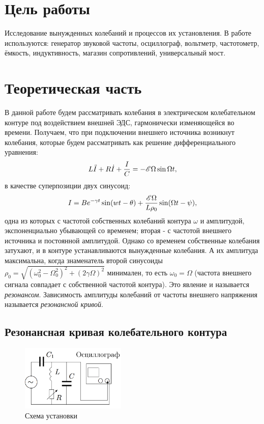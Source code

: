 \documentclass{letnab}
\begin{document}


\section{Цель работы}
Исследование вынужденных колебаний и процессов их установления.
В работе используются: генератор звуковой частоты, осциллограф, вольтметр, частотометр, ёмкость, индуктивность, магазин сопротивлений, универсальный мост.
\section{Теоретическая часть}

В данной работе будем рассматривать колебания в электрическом колебательном контуре под воздействием внешней ЭДС, гармонически изменяющейся во времени. 
Получаем, что при подключении внешнего источника возникнут колебания, которые будем рассматривать как решение дифференциального уравнения:
\begin{equation}
L\ddot{I} + R \dot{I} + \dfrac{I}{C} = - \mathscr{E} \Omega \sin \Omega t,
\end{equation}
в качестве суперпозиции двух синусоид: 
\begin{equation}
I = Be^{-\gamma t} \sin (wt-\theta) + \dfrac{\mathscr{E} \Omega}{L \rho_0} \sin (\Omega t - \psi),
\end{equation}
одна из которых с частотой собственных колебаний контура $\omega$ и амплитудой, экспоненциально убывающей со временем; вторая - с частотой внешнего источника и постоянной амплитудой. Однако со временем собственные колебания затухают, и в контуре устанавливаются вынужденные колебания. А их амплитуда максимальна, когда знаменатель второй синусоиды $\rho_0 = \sqrt{(\omega_0^2 - \Omega^2_0)^2 + (2\gamma \Omega)^2}$ минимален, то есть $\omega_0 = \Omega$ (частота внешнего сигнала совпадает с собственной частотой контура). Это явление и называется \textit{резонансом}. Зависимость амплитуды колебаний от частоты внешнего напряжения называется \textit{резонансной кривой}.

\subsection{Резонансная кривая колебательного контура}

\begin{figure}
\includegraphics[width=5cm]{Scheme2}
\caption{Схема установки}
\end{figure} 
\end{document}
